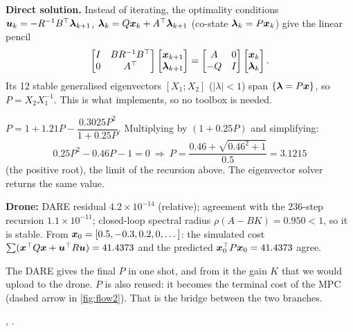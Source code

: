 \textbf{Direct solution.} Instead of iterating, the optimality conditions $\bm{u}_k=-R^{-1}B^\top\bm\lambda_{k+1}$,
$\bm\lambda_k=Q\bm{x}_k+A^\top\bm\lambda_{k+1}$ (co-state $\bm\lambda_k=P\bm{x}_k$) give the linear pencil
\[
  \begin{bmatrix}I&BR^{-1}B^\top\\0&A^\top\end{bmatrix}\begin{bmatrix}\bm{x}_{k+1}\\ \bm\lambda_{k+1}\end{bmatrix}
  =\begin{bmatrix}A&0\\-Q&I\end{bmatrix}\begin{bmatrix}\bm{x}_k\\ \bm\lambda_k\end{bmatrix}.
\]
Its 12 stable generalised eigenvectors $[X_1;X_2]$ ($|\lambda|<1$) span $\{\bm\lambda=P\bm{x}\}$, so $P=X_2X_1^{-1}$. This is
what  implements, so no toolbox is needed.

\begin{toybox}
$P=1+1.21P-\dfrac{0.3025P^2}{1+0.25P}$. Multiplying by $(1+0.25P)$ and simplifying:
\[
  0.25P^2-0.46P-1=0\ \Longrightarrow\ P=\frac{0.46+\sqrt{0.46^2+1}}{0.5}=3.1215
\]
(the positive root), the limit of the recursion above. The eigenvector solver returns the same value.

\textbf{Drone:} DARE residual $4.2\times10^{-14}$ (relative); agreement with the 236-step recursion $1.1\times10^{-11}$;
closed-loop spectral radius $\rho(A-BK)=0.950<1$, so it is stable. From $\bm{x}_0=[0.5,-0.3,0.2,0,\dots]$: the simulated cost
$\sum(\bm{x}^\top Q\bm{x}+\bm{u}^\top R\bm{u})=41.4373$ and the predicted $\bm{x}_0^\top P\bm{x}_0=41.4373$ agree.
\end{toybox}

\begin{projbox}
The DARE gives the final $P$ in one shot, and from it the gain $K$ that we would upload to the drone. $P$ is also
reused: it becomes the terminal cost of the MPC (dashed arrow in \cref{fig:flow2}). That is the bridge between the two
branches.
\end{projbox}

\begin{codebox}
\intoy {}, .
\end{codebox}

